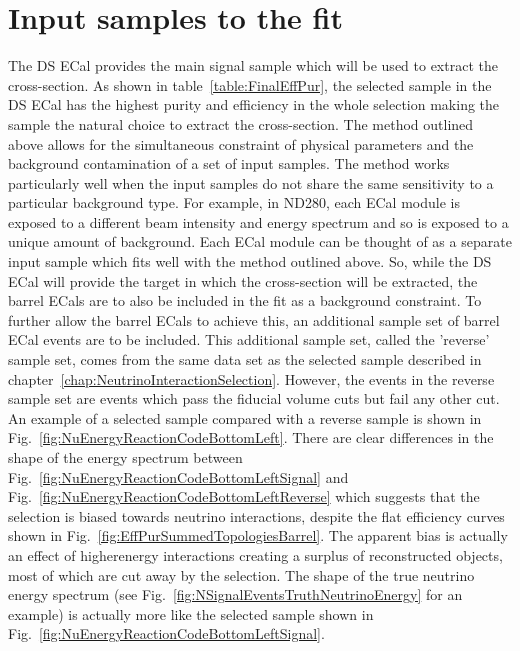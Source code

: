 \section{Input samples to the fit}
\label{sec:InputSamples}
The DS ECal provides the main signal sample which will be used to extract the cross-section.  As shown in table~\ref{table:FinalEffPur}, the selected sample in the DS ECal has the highest purity and efficiency in the whole selection making the sample the natural choice to extract the cross-section.
\newline
\newline
The method outlined above allows for the simultaneous constraint of physical parameters and the background contamination of a set of input samples.  The method works particularly well when the input samples do not share the same sensitivity to a particular background type.  For example, in ND280, each ECal module is exposed to a different beam intensity and energy spectrum and so is exposed to a unique amount of  background.  Each ECal module can be thought of as a separate input sample which fits well with the method outlined above.  So, while the DS ECal will provide the target in which the cross-section will be extracted, the barrel ECals are to also be included in the fit as a background constraint.  To further allow the barrel ECals to achieve this, an additional sample set of barrel ECal events are to be included.  This additional sample set, called the 'reverse' sample set,  comes from the same data set as the selected sample described in chapter~\ref{chap:NeutrinoInteractionSelection}.  However, the events in the reverse sample set are events which pass the fiducial volume cuts but fail any other cut.  An example of a selected sample compared with a reverse sample is shown in Fig.~\ref{fig:NuEnergyReactionCodeBottomLeft}.  There are clear differences in the shape of the energy spectrum between Fig.~\ref{fig:NuEnergyReactionCodeBottomLeftSignal} and Fig.~\ref{fig:NuEnergyReactionCodeBottomLeftReverse} which suggests that the selection is biased towards  neutrino interactions, despite the flat efficiency curves shown in Fig.~\ref{fig:EffPurSummedTopologiesBarrel}. The apparent bias is actually an effect of higherenergy interactions creating a surplus of reconstructed objects, most of which are cut away by the selection.  The shape of the true neutrino energy spectrum (see Fig.~\ref{fig:NSignalEventsTruthNeutrinoEnergy} for an example) is actually more like the selected sample shown in Fig.~\ref{fig:NuEnergyReactionCodeBottomLeftSignal}.
